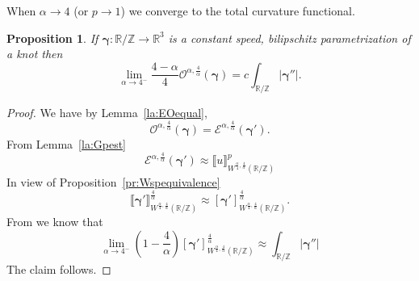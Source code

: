 \documentclass[a4paper,10pt,intlimits,ngerman]{amsart}
\newtheorem{proposition}[theorem]{Proposition}
\numberwithin{equation}{section}
\newcommand{\R}{\mathbb{R}}
\newcommand{\Z}{\mathbb{Z}}
\newcommand{\sol}{{\boldsymbol{\gamma}}}
\newcommand{\aeq}{\approx}
\newcommand{\brac}[1]{\left ( #1 \right )}
\begin{document}
When $\alpha \to 4$ (or $p \to 1$) we converge to the total curvature functional.
\begin{proposition}
If $\sol: \R/\Z \to \R^3$ is a constant speed, bilipschitz parametrization of a knot then
\[
 \lim_{\alpha \to 4^-} \frac{4-\alpha}{4} \mathcal{O}^{\alpha,\frac{4}{\alpha}}(\sol) = c \int_{\R / \Z} |\sol''|.
\]
\end{proposition}
\begin{proof}
We have by Lemma~\ref{la:EOequal},
\[
 \mathcal{O}^{\alpha,\frac{4}{\alpha}}(\sol) = \mathcal{E}^{\alpha,\frac{4}{\alpha}} (\sol').
\]
From Lemma~\ref{la:Gpest} 
\[
 \mathcal{E}^{\alpha,\frac{4}{\alpha}} (\sol') \aeq \llbracket u \rrbracket_{W^{\frac{\alpha}{4},\frac{4}{\alpha}}(\R/\Z)}^p
\]
In view of Proposition~\ref{pr:Wspequivalence}
\[
 \llbracket \sol' \rrbracket_{W^{\frac{\alpha}{4},\frac{4}{\alpha}}(\R/\Z)}^{\frac{4}{\alpha}} \aeq [\sol']_{W^{\frac{\alpha}{4},\frac{4}{\alpha}}(\R/\Z)}^{\frac{4}{\alpha}}.
\]
From \cite{BBM01} we know that
\[
 \lim_{\alpha \to 4^-} \brac{1-\frac{4}{\alpha}} [\sol' ]_{W^{\frac{\alpha}{4},\frac{4}{\alpha}}(\R/\Z)}^{\frac{4}{\alpha}} \aeq \int_{\R/\Z}|\sol''|
\]
The claim follows.
\end{proof}
\end{document}
